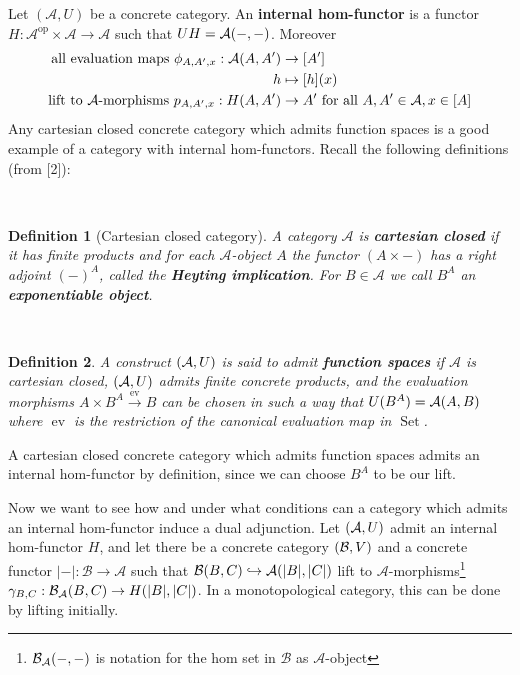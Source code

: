 \documentclass[12pt,a4paper]{article}
\newtheorem{definition}{Definition}[section] %
\DeclareMathOperator{\Set}{Set}
\DeclareMathOperator{\ev}{ev}
\DeclareMathOperator{\op}{op}
\def\HomA{\ensuremath\mathcal{A}}
\def\HomB{\ensuremath\mathcal{B}}
\def\concA{\ensuremath(\mathcal{A},U)}
\def\concB{\ensuremath(\mathcal{B},V)}
\begin{document}
Let $(\mathcal{A}, U)$ be a concrete category. An \textbf{internal hom-functor} is a functor $H: \mathcal{A}^{\op} \times \mathcal{A} \to \mathcal{A}$ such that $UH = \HomA(-,-)$. Moreover \begin{align*}
	\text{all evaluation maps } \phi_{A,A',x}: \HomA(A,A') &\to [A']\\
	h &\mapsto [h](x)\\
	\text{lift to $\mathcal{A}$-morphisms } p_{A,A',x}: H(A,A') &\to A' \text{ for all } A, A' \in \mathcal{A}, x \in [A]
\end{align*}
Any cartesian closed concrete category which admits function spaces is a good example of a category with internal hom-functors. Recall the following definitions (from [2]):

\
\begin{definition}[Cartesian closed category] A category $\mathcal{A}$ is \textbf{cartesian closed} if it has finite products and for each $\mathcal{A}$-object $A$ the functor $(A \times -)$ has a right adjoint  $(-)^A$, called the \textbf{Heyting implication}. For $B \in \mathcal{A}$ we call $B^A$ an \textbf{exponentiable object}. 
\end{definition}
\

\begin{definition}
	A construct $ \concA$ is said to admit \textbf{function spaces} if $\mathcal{A}$ is cartesian closed, $\concA$ admits finite concrete products, and the evaluation morphisms $A \times B^A \stackrel{\ev}{\to} B$ can be chosen in such a way that $U(B^A)= \HomA(A,B)$ where $\ev$ is the restriction of the canonical evaluation map in $\Set$.  \end{definition}

A cartesian closed concrete category which admits function spaces admits an internal hom-functor by definition, since we can choose $B^A$ to be our lift.

 
Now we want to see how and under what conditions can  a category which admits an internal hom-functor  induce a dual adjunction. Let $\concA$ admit an internal hom-functor $H$, and let there be a concrete category $\concB$ and a concrete functor $\lvert - \lvert : \mathcal{B} \to \mathcal{A}$ such that $\HomB(B, C) \hookrightarrow \HomA(\lvert B \lvert, \lvert C \lvert)$ lift to $\mathcal{A}$-morphisms\footnote{$\HomB_\mathcal{A}(-,-)$ is notation for the hom set in $\mathcal{B}$ as $\mathcal{A}$-object} $\gamma_{B,C}: \HomB_\mathcal{A}(B,C) \to H(\lvert B \lvert, \lvert C\lvert)$.  In a monotopological category, this can be done by lifting initially.
\end{document}
